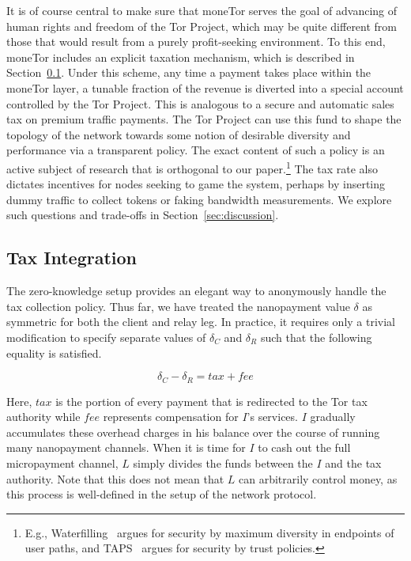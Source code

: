 It is of course central to make sure that moneTor serves the goal of advancing of human rights and freedom of the Tor Project, which may be quite different from those that would result from a purely profit-seeking environment.
To this end, moneTor includes an explicit taxation mechanism, which is described in Section~\ref{sec:tax_integration}.
Under this scheme, any time a payment takes place within the moneTor layer, a tunable fraction of the revenue is diverted into a special account controlled by the Tor Project.
This is analogous to a secure and automatic sales tax on premium traffic payments.
The Tor Project can use this fund to shape the topology of the network towards some notion of desirable diversity and performance via a transparent policy.
The exact content of such a policy is an active subject of research that is orthogonal to our paper.\footnote{E.g., Waterfilling~\cite{waterfilling-pets2017} argues for security by maximum diversity in endpoints of user paths, and TAPS~\cite{taps-ndss2017} argues for security by trust policies.}
The tax rate also dictates incentives for nodes seeking to game the system, perhaps by inserting dummy traffic to collect tokens or faking bandwidth measurements.
We explore such questions and trade-offs in Section~\ref{sec:discussion}.

\subsection{Tax Integration}
\label{sec:tax_integration}

The zero-knowledge setup provides an elegant way to anonymously handle the tax collection policy.
Thus far, we have treated the nanopayment value $\delta$ as symmetric for both the client and relay leg.
In practice, it requires only a trivial modification to specify separate values of $\delta_C$ and $\delta_R$ such that the following equality is satisfied.

\begin{equation}
  \delta_C - \delta_R = \mathit{tax} + \mathit{fee}
  \label{eq:payment}
\end{equation}

\medskip \noindent Here, $\mathit{tax}$ is the portion of every payment that is redirected to the Tor tax authority while $\mathit{fee}$ represents compensation for $I$'s services.
$I$ gradually accumulates these overhead charges in his balance over the course of running many nanopayment channels.
When it is time for $I$ to cash out the full micropayment channel, $L$ simply divides the funds between the $I$ and the tax authority.
Note that this does not mean that $L$ can arbitrarily control money, as this process is well-defined in the setup of the network protocol.

